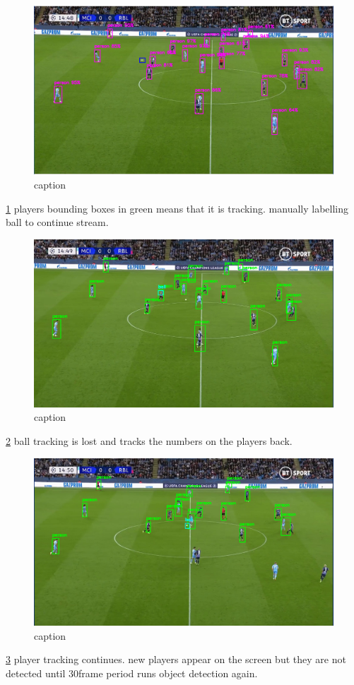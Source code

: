\documentclass[
11pt,
twoside
]{report}
\begin{document}
\begin{figure}[H]
    \includegraphics[keepaspectratio, width=\columnwidth]{Screenshot_2022-03-03_21-32-51.png}
    \caption{caption}
    \label{img:2}
\end{figure}
\ref{img:2} players bounding boxes in green means that it is tracking. manually labelling ball to continue stream.

\begin{figure}[H]
    \includegraphics[keepaspectratio, width=\columnwidth]{Screenshot_2022-03-03_21-35-39.png}
    \caption{caption}
    \label{img:3}
\end{figure}
\ref{img:3} ball tracking is lost and tracks the numbers on the players back.

\begin{figure}[H]
    \includegraphics[keepaspectratio, width=\columnwidth]{Screenshot_2022-03-03_21-36-05.png}
    \caption{caption}
    \label{img:4}
\end{figure}
\ref{img:4} player tracking continues. new players appear on the screen but they are not
detected until 30frame period runs object detection again.
\end{document}
